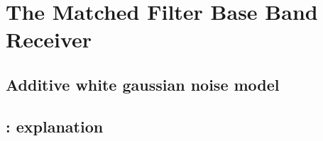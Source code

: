 \section{The Matched Filter Base Band Receiver}



\subsection{Additive white gaussian noise model}



\subsection{: explanation}



\subsection{}
